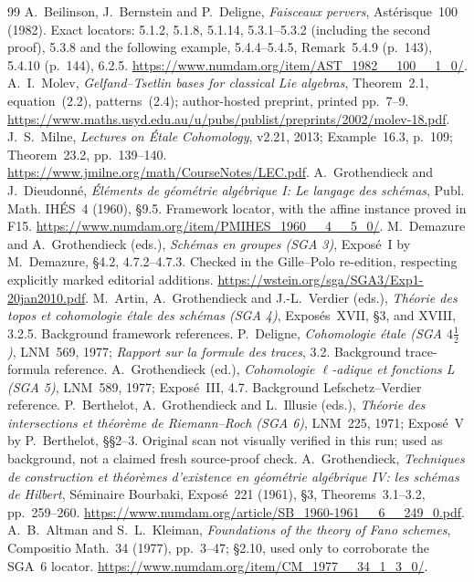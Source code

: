 \begin{thebibliography}{99}
 A.~Beilinson, J.~Bernstein and P.~Deligne, \emph{Faisceaux pervers}, Ast\'erisque~100 (1982). Exact locators: 5.1.2, 5.1.8, 5.1.14, 5.3.1--5.3.2 (including the second proof), 5.3.8 and the following example, 5.4.4--5.4.5, Remark~5.4.9 (p.~143), 5.4.10 (p.~144), 6.2.5. \url{https://www.numdam.org/item/AST_1982__100__1_0/}.
 A.~I.~Molev, \emph{Gelfand--Tsetlin bases for classical Lie algebras}, Theorem~2.1, equation~(2.2), patterns~(2.4); author-hosted preprint, printed pp.~7--9. \url{https://www.maths.usyd.edu.au/u/pubs/publist/preprints/2002/molev-18.pdf}.
 J.~S.~Milne, \emph{Lectures on \'Etale Cohomology}, v2.21, 2013; Example~16.3, p.~109; Theorem~23.2, pp.~139--140. \url{https://www.jmilne.org/math/CourseNotes/LEC.pdf}.
 A.~Grothendieck and J.~Dieudonn\'e, \emph{\'El\'ements de g\'eom\'etrie alg\'ebrique I: Le langage des sch\'emas}, Publ. Math. IH\'ES~4 (1960), \S9.5. Framework locator, with the affine instance proved in F15. \url{https://www.numdam.org/item/PMIHES_1960__4__5_0/}.
 M.~Demazure and A.~Grothendieck (eds.), \emph{Sch\'emas en groupes (SGA 3)}, Expos\'e~I by M.~Demazure, \S4.2, 4.7.2--4.7.3. Checked in the Gille--Polo re-edition, respecting explicitly marked editorial additions. \url{https://wstein.org/sga/SGA3/Exp1-20jan2010.pdf}.
 M.~Artin, A.~Grothendieck and J.-L.~Verdier (eds.), \emph{Th\'eorie des topos et cohomologie \'etale des sch\'emas (SGA 4)}, Expos\'es~XVII, \S3, and XVIII, 3.2.5. Background framework references.
 P.~Deligne, \emph{Cohomologie \'etale (SGA $4\frac12$)}, LNM~569, 1977; \emph{Rapport sur la formule des traces}, 3.2. Background trace-formula reference.
 A.~Grothendieck (ed.), \emph{Cohomologie \(\ell\)-adique et fonctions L (SGA 5)}, LNM~589, 1977; Expos\'e~III, 4.7. Background Lefschetz--Verdier reference.
 P.~Berthelot, A.~Grothendieck and L.~Illusie (eds.), \emph{Th\'eorie des intersections et th\'eor\`eme de Riemann--Roch (SGA 6)}, LNM~225, 1971; Expos\'e~V by P.~Berthelot, \S\S2--3. Original scan not visually verified in this run; used as background, not a claimed fresh source-proof check.
 A.~Grothendieck, \emph{Techniques de construction et th\'eor\`emes d'existence en g\'eom\'etrie alg\'ebrique IV: les sch\'emas de Hilbert}, S\'eminaire Bourbaki, Expos\'e~221 (1961), \S3, Theorems~3.1--3.2, pp.~259--260. \url{https://www.numdam.org/article/SB_1960-1961__6__249_0.pdf}.
 A.~B.~Altman and S.~L.~Kleiman, \emph{Foundations of the theory of Fano schemes}, Compositio Math.~34 (1977), pp.~3--47; \S2.10, used only to corroborate the SGA~6 locator. \url{https://www.numdam.org/item/CM_1977__34_1_3_0/}.

\end{thebibliography}
